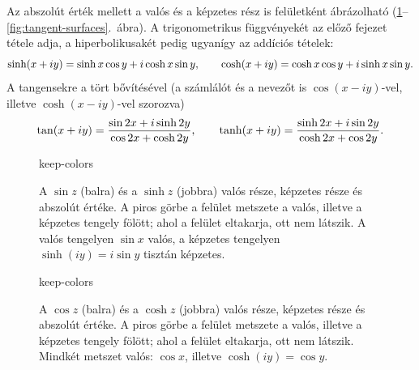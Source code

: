 \documentclass[11pt]{scrartcl}
\newcommand{\complexpanel}[2]{\directlua{complexpanel("#1", "#2")}}
\theoremstyle{definition}
\theoremstyle{remark}
\begin{document}
Az abszolút érték mellett a valós és a képzetes rész is felületként
ábrázolható (\ref{fig:sine-surfaces}--\ref{fig:tangent-surfaces}.~ábra). A
trigonometrikus függvényekét az előző fejezet tétele adja, a hiperbolikusakét
pedig ugyanígy az addíciós tételek:
\[
	\sinh(x + iy) = \sinh x \cos y + i \cosh x \sin y, \qquad
	\cosh(x + iy) = \cosh x \cos y + i \sinh x \sin y\text.
\]
A tangensekre a tört bővítésével (a számlálót és a nevezőt is
$\cos(x - iy)$-vel, illetve $\cosh(x - iy)$-vel szorozva)
\[
	\tan(x + iy) = \frac{\sin 2x + i \sinh 2y}{\cos 2x + \cosh 2y}, \qquad
	\tanh(x + iy) = \frac{\sinh 2x + i \sin 2y}{\cosh 2x + \cos 2y}\text.
\]

\begin{figure}[p]
	\centering
	\begin{BlockClass}{keep-colors}
	\end{BlockClass}
	\caption{A $\sin z$ (balra) és a $\sinh z$ (jobbra) valós része, képzetes
		része és abszolút értéke. A piros görbe a felület metszete a valós, illetve a képzetes tengely
		fölött; ahol a felület eltakarja, ott nem látszik. A valós tengelyen
		$\sin x$ valós, a képzetes tengelyen $\sinh(iy) = i \sin y$ tisztán
		képzetes.}
	\label{fig:sine-surfaces}
\end{figure}

\begin{figure}[p]
	\centering
	\begin{BlockClass}{keep-colors}
	\end{BlockClass}
	\caption{A $\cos z$ (balra) és a $\cosh z$ (jobbra) valós része, képzetes
		része és abszolút értéke. A piros görbe a felület metszete a valós, illetve a képzetes tengely
		fölött; ahol a felület eltakarja, ott nem látszik. Mindkét metszet valós:
		$\cos x$, illetve $\cosh(iy) = \cos y$.}
	\label{fig:cosine-surfaces}
\end{figure}
\end{document}

